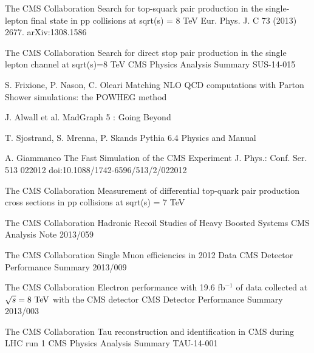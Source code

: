 \begin{thebibliography}{2}
             {The CMS Collaboration}
             {Search for top-squark pair production in the single-lepton final state in pp collisions at sqrt(s) = 8 TeV}
             {Eur. Phys. J. C 73 (2013) 2677. arXiv:1308.1586}

             {The CMS Collaboration}
             {Search for direct stop pair production in the single lepton channel at sqrt(s)=8 TeV}
             {CMS Physics Analysis Summary SUS-14-015}


             {S. Frixione, P. Nason, C. Oleari}
             {Matching NLO QCD computations with Parton Shower simulations: the POWHEG method}
             {}

             {J. Alwall et al.}
             {MadGraph 5 : Going Beyond}
             {}

             {T. Sjostrand, S. Mrenna, P. Skands}
             {Pythia 6.4 Physics and Manual}
             {}

             {A. Giammanco}
             {The Fast Simulation of the CMS Experiment}
             {J. Phys.: Conf. Ser. 513 022012 doi:10.1088/1742-6596/513/2/022012}

             {The CMS Collaboration}
             {Measurement of differential top-quark pair production
             cross sections in pp collisions at sqrt(s) = 7 TeV}
             {}

             {The CMS Collaboration}
             {Hadronic Recoil Studies of Heavy Boosted Systems}
             {CMS Analysis Note 2013/059}


             {The CMS Collaboration}
             {Single Muon efficiencies in 2012 Data}
             {CMS Detector Performance Summary 2013/009}

             {The CMS Collaboration}
             {Electron performance with 19.6 fb$^{-1}$ of data collected at $\sqrt{s}=8~\text{TeV}$ with the CMS detector}
             {CMS Detector Performance Summary 2013/003}

             {The CMS Collaboration}
             {Tau reconstruction and identification in CMS during LHC run 1}
             {CMS Physics Analysis Summary TAU-14-001}


\end{thebibliography}
